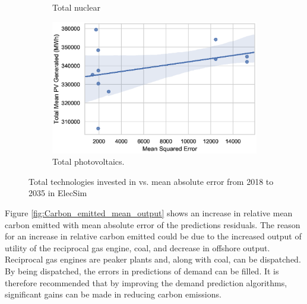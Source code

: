 \begin{figure}
\begin{subfigure}{0.3\textwidth}
		\caption{Total nuclear}
		\label{fig:total_nuclear_mean_output}
	\end{subfigure}
	\hfil
	\begin{subfigure}{0.3\textwidth}  
		\includegraphics[width=\columnwidth]{Chapter5/figures/market-forecasting/results/elecsim_results/results_2/total_PV_mean_output.eps}
		\caption{Total photovoltaics.}
		\label{fig:total_PV_mean_output}
	\end{subfigure}
	\label{fig:ccgt_coal_onshore_offshore_totals}
	\caption{Total technologies invested in vs. mean absolute error from 2018 to 2035 in ElecSim}
\end{figure}




Figure \ref{fig:Carbon_emitted_mean_output} shows an increase in relative mean carbon emitted with mean absolute error of the predictions residuals. The reason for an increase in relative carbon emitted could be due to the increased output of utility of the reciprocal gas engine, coal, and decrease in offshore output. Reciprocal gas engines are peaker plants and, along with coal, can be dispatched. By being dispatched, the errors in predictions of demand can be filled. It is therefore recommended that by improving the demand prediction algorithms, significant gains can be made in reducing carbon emissions.



